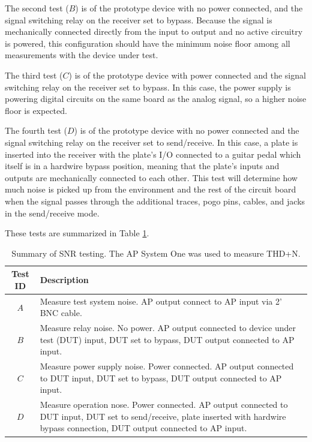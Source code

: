 \documentclass{article}
\begin{document}
	The second test ($B$) is of the prototype device with no power connected, and the signal switching relay on the receiver set to bypass.  Because the signal is mechanically connected directly from the input to output and no active circuitry is powered, this configuration should have the minimum noise floor among all measurements with the device under test.

	The third test ($C$) is of the prototype device with power connected and the signal switching relay on the receiver set to bypass.  In this case, the power supply is powering digital circuits on the same board as the analog signal, so a higher noise floor is expected.

	The fourth test ($D$) is of the prototype device with no power connected and the signal switching relay on the receiver set to send/receive.  In this case, a plate is inserted into the receiver with the plate's I/O connected to a guitar pedal which itself is in a hardwire bypass position, meaning that the plate's inputs and outputs are mechanically connected to each other.  This test will determine how much noise is picked up from the environment and the rest of the circuit board when the signal passes through the additional traces, pogo pins, cables, and jacks in the send/receive mode.

	These tests are summarized in Table \ref{tab:SNRtests}.

	\begin{table}
	\begin{center}
	\begin{tabular}{ |c p{5in}| }
	\hline
	Test ID & Description \\ 
	\hline
	$A$ & Measure test system noise.  AP output connect to AP input via 2' BNC cable. \\
	$B$ & Measure relay noise.  No power.   AP output connected to device under test (DUT) input, DUT set to bypass, DUT output connected to AP input. \\
	$C$ & Measure power supply noise.  Power connected.  AP output connected to DUT input, DUT set to bypass, DUT output connected to AP input. \\
	$D$ & Measure operation nose.  Power connected.   AP output connected to DUT input, DUT set to send/receive, plate inserted with hardwire bypass connection, DUT output connected to AP input.\\
   	\hline
	\end{tabular}
	\caption{Summary of SNR testing.  The AP System One was used to measure THD+N.}
	\label{tab:SNRtests}
	\end{center}
	\end{table}
\end{document}
